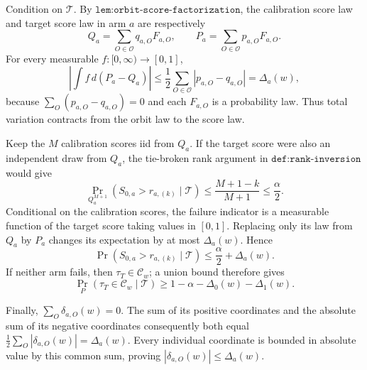Condition on \(\mathcal T\). By \(\texttt{lem:orbit-score-factorization}\), the calibration score law and target score law in arm \(a\) are respectively \[Q_a=\sum_{O\in\mathcal O}q_{a,O}F_{a,O},\qquad P_a=\sum_{O\in\mathcal O}p_{a,O}F_{a,O}.\] For every measurable \(f:[0,\infty)\to[0,1]\), \[\left|\int f\,d(P_a-Q_a)\right|\le\frac12\sum_{O\in\mathcal O}|p_{a,O}-q_{a,O}|=\Delta_a(w),\] because \(\sum_O(p_{a,O}-q_{a,O})=0\) and each \(F_{a,O}\) is a probability law. Thus total variation contracts from the orbit law to the score law.

Keep the \(M\) calibration scores iid from \(Q_a\). If the target score were also an independent draw from \(Q_a\), the tie-broken rank argument in \(\texttt{def:rank-inversion}\) would give \[\Pr_{Q_a^{M+1}}(S_{0,a}>r_{a,(k)}\mid\mathcal T)\le\frac{M+1-k}{M+1}\le\frac\alpha2.\] Conditional on the calibration scores, the failure indicator is a measurable function of the target score taking values in \([0,1]\). Replacing only its law from \(Q_a\) by \(P_a\) changes its expectation by at most \(\Delta_a(w)\). Hence \[\Pr(S_{0,a}>r_{a,(k)}\mid\mathcal T)\le\frac\alpha2+\Delta_a(w).\] If neither arm fails, then \(\tau_T\in\mathcal C_w\); a union bound therefore gives \[\Pr_P(\tau_T\in\mathcal C_w\mid\mathcal T)\ge1-\alpha-\Delta_0(w)-\Delta_1(w).\]

Finally, \(\sum_O\delta_{a,O}(w)=0\). The sum of its positive coordinates and the absolute sum of its negative coordinates consequently both equal \(\tfrac12\sum_O|\delta_{a,O}(w)|=\Delta_a(w)\). Every individual coordinate is bounded in absolute value by this common sum, proving \(|\delta_{a,O}(w)|\le\Delta_a(w)\).